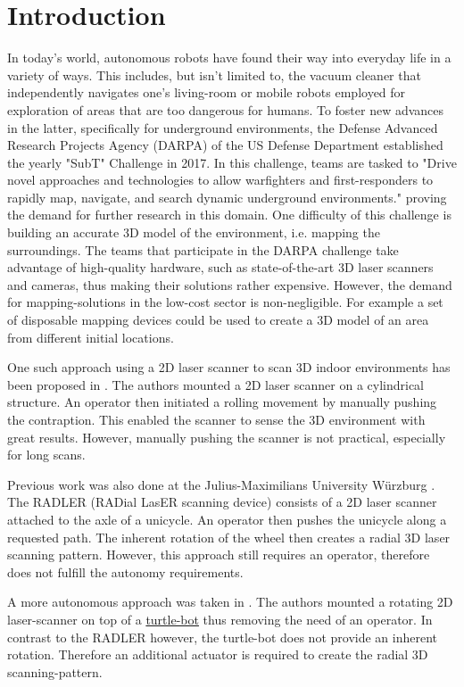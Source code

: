 \section{Introduction}
\label{sec:introduction}

In today's world, autonomous robots have found their way into everyday life in a variety of ways. This includes, but isn't limited to, the vacuum cleaner that independently navigates one's living-room or mobile robots employed for exploration of areas that are too dangerous for humans. To foster new advances in the latter, specifically for underground environments, the  Defense Advanced Research Projects Agency (DARPA) of the US Defense Department established the yearly "SubT" Challenge in 2017. In this challenge, teams are tasked to "Drive novel approaches and technologies to allow warfighters and first-responders to rapidly map, navigate, and search dynamic underground environments."  \cite{allen} proving the demand for further research in this domain. One difficulty of this challenge is building an accurate 3D model of the environment, i.e. mapping the surroundings. The teams that participate in the DARPA challenge take advantage of high-quality hardware, such as state-of-the-art 3D laser scanners and cameras, thus making their solutions rather expensive. However, the demand for mapping-solutions in the low-cost sector is non-negligible. For example a set of disposable mapping devices could be used to create a 3D model of an area from different initial locations.

One such approach using a 2D laser scanner to scan 3D indoor environments has been proposed in  \cite{classical_mechanics_scanner}. The authors mounted a 2D laser scanner on a cylindrical structure. An operator then initiated a rolling movement by manually pushing the contraption. This enabled the scanner to sense the 3D environment with great results. However, manually pushing the scanner is not practical, especially for long scans.

Previous work was also done at the Julius-Maximilians University W\"urzburg \cite{ISER2018}. The RADLER (RADial LasER scanning device) consists of a 2D laser scanner attached to the axle of a unicycle. An operator then pushes the unicycle along a requested path. The inherent rotation of the wheel then creates a radial 3D laser scanning pattern. However, this approach still requires an operator, therefore does not fulfill the autonomy requirements. 

A more autonomous approach was taken in \cite{3D_per_2D_based}. The authors mounted a rotating 2D laser-scanner on top of a \href{https://www.turtlebot.com}{turtle-bot} thus removing the need of an operator. In contrast to the RADLER however, the turtle-bot does not provide an inherent rotation. Therefore an additional actuator is required to create the radial 3D scanning-pattern. 

